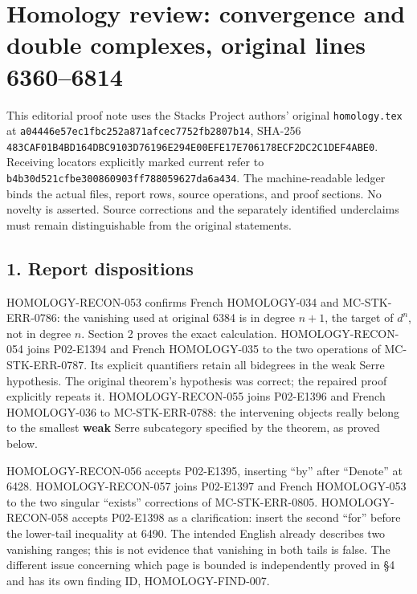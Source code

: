 \section{Homology review: convergence and double complexes, original lines 6360--6814}\label{note-07-homology-review-convergence-and-double-complexes-original-lines-63606814}

This editorial proof note uses the Stacks Project authors' original \texttt{homology.tex} at \texttt{a04446e5\allowbreak{}7ec1fbc2\allowbreak{}52a871af\allowbreak{}cec7752f\allowbreak{}b2807b14}, SHA-256 \texttt{483CAF01\allowbreak{}B4BD164D\allowbreak{}BC9103D7\allowbreak{}6196E294\allowbreak{}E00EFE17\allowbreak{}E706178E\allowbreak{}CF2DC2C1\allowbreak{}DEF4ABE0}. Receiving locators explicitly marked current refer to \texttt{b4b30d52\allowbreak{}1cfbe300\allowbreak{}860903ff\allowbreak{}78805962\allowbreak{}7da6a434}. The machine-readable ledger binds the actual files, report rows, source operations, and proof sections. No novelty is asserted. Source corrections and the separately identified underclaims must remain distinguishable from the original statements.

\subsection{1. Report dispositions}\label{note-07-report-dispositions}

HOMOLOGY-RECON-053 confirms French HOMOLOGY-034 and MC-STK-ERR-0786: the vanishing used at original 6384 is in degree \(n+1\), the target of \(d^n\), not in degree \(n\). Section 2 proves the exact calculation. HOMOLOGY-RECON-054 joins P02-E1394 and French HOMOLOGY-035 to the two operations of MC-STK-ERR-0787. Its explicit quantifiers retain all bidegrees in the weak Serre hypothesis. The original theorem's hypothesis was correct; the repaired proof explicitly repeats it. HOMOLOGY-RECON-055 joins P02-E1396 and French HOMOLOGY-036 to MC-STK-ERR-0788: the intervening objects really belong to the smallest \textbf{weak} Serre subcategory specified by the theorem, as proved below.

HOMOLOGY-RECON-056 accepts P02-E1395, inserting ``by'' after ``Denote'' at 6428. HOMOLOGY-RECON-057 joins P02-E1397 and French HOMOLOGY-053 to the two singular ``exists'' corrections of MC-STK-ERR-0805. HOMOLOGY-RECON-058 accepts P02-E1398 as a clarification: insert the second ``for'' before the lower-tail inequality at 6490. The intended English already describes two vanishing ranges; this is not evidence that vanishing in both tails is false. The different issue concerning which page is bounded is independently proved in §4 and has its own finding ID, HOMOLOGY-FIND-007.

